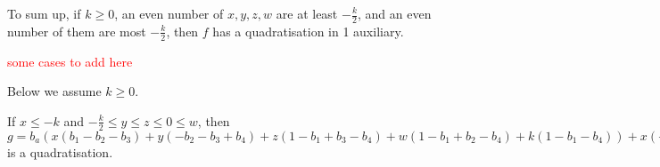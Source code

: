 \documentclass[11pt]{scrartcl}
\begin{document}
To sum up, if $k\ge 0$, an even number of $x, y, z, w$ are at least $-\frac{k}{2}$, and an even number of them are most $-\frac{k}{2}$, then $f$ has a quadratisation in 1 auxiliary.

\textcolor{red}{some cases to add here}
\begin{lemma}
\end{lemma}

\begin{lemma}
\end{lemma}

Below we assume $k \ge 0$.

\begin{lemma}
	If $x\le -k$ and $-\frac{k}{2} \le y \le z \le 0 \le w$, then 
	$g = b_a(x(b_1-b_2-b_3)+y(-b_2-b_3+b_4)+z(1-b_1+b_3-b_4)+w(1-b_1+b_2-b_4)+k(1-b_1-b_4))
+x(-b_1+b_1 b_2+b_1 b_3)+y(-b_4+b_2 b_4+b_3 b_4)+z b_1 b_4 +w b_1 b_4 +k b_1 b_4 $ is a quadratisation.

\end{lemma}
\end{document}
